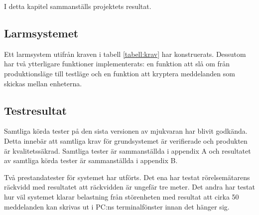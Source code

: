 I detta kapitel sammanställs projektets resultat.

\subsection{Larmsystemet}
Ett larmsystem utifrån kraven i tabell \ref{tabell:krav} har konstruerats. Dessutom har två ytterligare funktioner implementerats: en funktion att slå om från produktionsläge till testläge och en funktion att kryptera meddelanden som skickas mellan enheterna.

\subsection{Testresultat}

Samtliga körda tester på den sista versionen av mjukvaran har blivit godkända.  Detta innebär att samtliga krav för grundsystemet är verifierade och produkten är kvalitetssäkrad. Samtliga tester är sammanställda i appendix A och resultatet av samtliga körda tester är sammanställda i appendix B.

Två prestandatester för systemet har utförts. Det ena har testat rörelsemätarens räckvidd med resultatet att räckvidden är ungefär tre meter. Det andra har testat hur väl systemet klarar belastning från störenheten med resultat att cirka 50 meddelanden kan skrivas ut i PC:ns terminalfönster innan det hänger sig.

